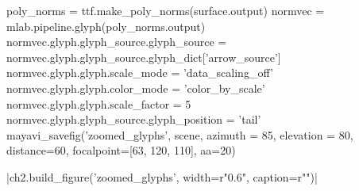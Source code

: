 \begin{pycode}[chapter2]
poly_norms = ttf.make_poly_norms(surface.output)
normvec = mlab.pipeline.glyph(poly_norms.output)
normvec.glyph.glyph_source.glyph_source = normvec.glyph.glyph_source.glyph_dict['arrow_source']
normvec.glyph.glyph.scale_mode = 'data_scaling_off'
normvec.glyph.glyph.color_mode = 'color_by_scale'
normvec.glyph.glyph.scale_factor = 5
normvec.glyph.glyph_source.glyph_position = 'tail'
mayavi_savefig('zoomed_glyphs', scene, azimuth = 85, elevation = 80, distance=60, focalpoint=[63, 120, 110], aa=20)
\end{pycode}
\py[chapter2]|ch2.build_figure('zoomed_glyphs', width=r"0.6\columnwidth",
caption=r"")|
